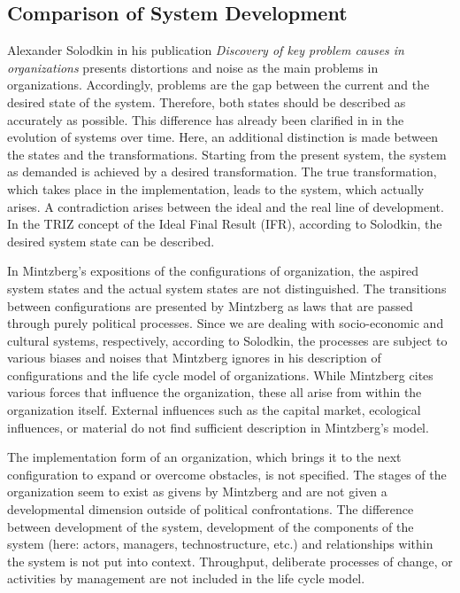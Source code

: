 \documentclass[a4paper,12pt]{article}
\begin{document}
\subsection{Comparison of System Development}

Alexander Solodkin in his publication \emph{Discovery of key problem causes in
  organizations} \cite{solodkin} presents distortions and noise as the main
problems in organizations. Accordingly, problems are the gap between the
current and the desired state of the system. Therefore, both states should be
described as accurately as possible. This difference has already been
clarified in \cite{graebe:2021} in the evolution of systems over time. Here,
an additional distinction is made between the states and the transformations.
Starting from the present system, the system as demanded is achieved by a
desired transformation. The true transformation, which takes place in the
implementation, leads to the system, which actually arises. A contradiction
arises between the ideal and the real line of development. In the TRIZ concept
of the Ideal Final Result (IFR), according to Solodkin, the desired system
state can be described.

In Mintzberg's expositions of the configurations of organization, the aspired
system states and the actual system states are not distinguished. The
transitions between configurations are presented by Mintzberg as laws that are
passed through purely political processes. Since we are dealing with
socio-economic and cultural systems, respectively, according to Solodkin, the
processes are subject to various biases and noises that Mintzberg ignores in
his description of configurations and the life cycle model of organizations.
While Mintzberg cites various forces that influence the organization, these
all arise from within the organization itself. External influences such as the
capital market, ecological influences, or material do not find sufficient
description in Mintzberg's model.

The implementation form of an organization, which brings it to the next
configuration to expand or overcome obstacles, is not specified. The stages of
the organization seem to exist as givens by Mintzberg and are not given a
developmental dimension outside of political confrontations. The difference
between development of the system, development of the components of the system
(here: actors, managers, technostructure, etc.) and relationships within the
system is not put into context. Throughput, deliberate processes of change, or
activities by management are not included in the life cycle model.
\end{document}
